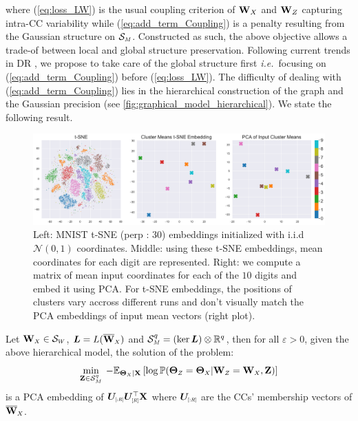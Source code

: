 where (\ref{eq:loss_LW}) is the usual coupling criterion of $\mathbf{W}_X$ and $\mathbf{W}_Z$ capturing intra-CC variability while (\ref{eq:add_term_Coupling}) is a penalty resulting from the Gaussian structure on $\mathcal{S}_{\scaleto{M}{4pt}}$. Constructed as such, the above objective allows a trade-of between local and global structure preservation. Following current trends in DR \cite{kobak2021initialization}, we propose to take care of the global structure first \textit{i.e.}\ focusing on (\ref{eq:add_term_Coupling}) before (\ref{eq:loss_LW}). The difficulty of dealing with (\ref{eq:add_term_Coupling}) lies in the hierarchical construction of the graph and the Gaussian precision (see \cref{fig:graphical_model_hierarchical}). We state the following result.

\begin{figure}
\begin{center}
\centerline{\includegraphics[width=0.5\columnwidth]{Figures/tSNE_truth.pdf}}
\caption{Left: MNIST t-SNE (perp : 30) embeddings initialized with i.i.d $\mathcal{N}(0,1)$ coordinates. Middle: using these t-SNE embeddings, mean coordinates for each digit are represented. Right: we compute a matrix of mean input coordinates for each of the $10$ digits and embed it using PCA. For t-SNE embeddings, the positions of clusters vary accross different runs and don't visually match the PCA embeddings of input mean vectors (right plot).}
\label{fig:tSNE-clusters-truth}
\end{center}
\end{figure}

\begin{corollary}\label{corollary_ccPCA}
Let $\Wb_{\scaleto{X}{4pt}} \in \mathcal{S}_{\scaleto{W}{4pt}}$, $\bm{L} = L(\overline{\Wb}_{\scaleto{X}{4pt}})$ and $\mathcal{S}^q_{\scaleto{M}{4pt}}= (\ker \bm{L}) \otimes \mathbb{R}^q$, then for all $\varepsilon > 0$, given the above hierarchical model, the solution of the problem:
$$\min_{\Zb \in \mathcal{S}^q_{M}} \: -\mathbb{E}_{\bm{\Theta}_{\scaleto{X}{3pt}}| \Xb}\left[ \log \mathbb{P}(\bm{\Theta}_{\scaleto{Z}{4pt}} = \bm{\Theta}_{\scaleto{X}{4pt}}| \Wb_{\scaleto{Z}{4pt}} = \Wb_{\scaleto{X}{4pt}}, \Zb) \right]$$
is a PCA embedding of $\bm{U}_{\scaleto{[:R]}{5pt}}\bm{U}_{\scaleto{[R]}{5pt}}^\top\Xb$ where $\bm{U}_{\scaleto{[:R]}{5pt}}$ are the CCs' membership vectors of $\overline{\Wb}_{\scaleto{X}{4pt}}$.
\end{corollary}

